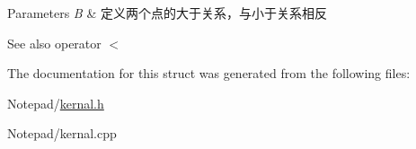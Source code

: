 \begin{DoxyParams}{Parameters}
{\em B} & 定义两个点的大于关系，与小于关系相反 \\
\hline
\end{DoxyParams}
\begin{DoxySeeAlso}{See also}
operator $<$ 
\end{DoxySeeAlso}


The documentation for this struct was generated from the following files\+:\begin{DoxyCompactItemize}
\item 
Notepad/\hyperlink{kernal_8h}{kernal.\+h}\item 
Notepad/kernal.\+cpp\end{DoxyCompactItemize}

